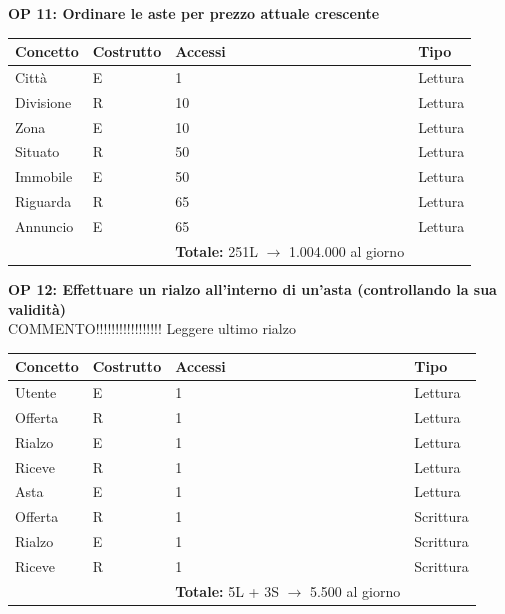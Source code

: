 \documentclass[a4paper,12pt]{report}
\begin{document}
            \textbf{OP 11: Ordinare le aste per prezzo attuale crescente}
        	\begin{table}[H]
            \centering
             \begin{tabular}{llll}
             \rowcolor{yellow!20} \textbf{Concetto} & \textbf{Costrutto} & \textbf{Accessi} & \textbf{Tipo}\\ [0.5ex] 
             \hline
             Città & E & 1 & Lettura \\ 
             Divisione & R & 10 & Lettura \\ 
             Zona & E & 10 & Lettura \\ 
             Situato & R & 50 & Lettura \\ 
             Immobile & E & 50 & Lettura \\ 
             Riguarda & R & 65 & Lettura \\ 
             Annuncio & E & 65 & Lettura \\ 
             \hline
                \rowcolor{yellow!20} &   & \textbf{Totale:} 251L $\rightarrow$ 1.004.000 al giorno &  \\ [1ex] 
             
             \end{tabular}
            \end{table}

            \textbf{OP 12: Effettuare un rialzo all’interno di un’asta (controllando la sua validità)} \\
            COMMENTO!!!!!!!!!!!!!!!!! Leggere ultimo rialzo
        	\begin{table}[H]
            \centering
             \begin{tabular}{llll}
             \rowcolor{yellow!20} \textbf{Concetto} & \textbf{Costrutto} & \textbf{Accessi} & \textbf{Tipo}\\ [0.5ex] 
             \hline
             Utente & E & 1 & Lettura \\ 
             Offerta & R & 1 & Lettura \\ 
             Rialzo & E & 1 & Lettura \\ 
             Riceve & R & 1 & Lettura \\ 
             Asta & E & 1 & Lettura \\ 
             Offerta & R & 1 & Scrittura \\ 
             Rialzo & E & 1 & Scrittura \\ 
             Riceve & R & 1 & Scrittura \\ 
             \hline
                \rowcolor{yellow!20} &   & \textbf{Totale:} 5L + 3S $\rightarrow$ 5.500 al giorno &  \\ [1ex] 
             
             \end{tabular}
            \end{table}
\end{document}
